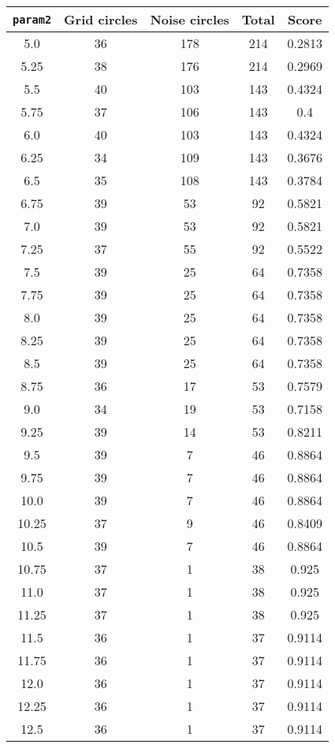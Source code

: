 \documentclass[letterpaper, 12pt]{article}
\begin{document}
\begin{longtable}{|c|c|c|c|c|}
\hline
\textbf{\texttt{param2}} & \textbf{Grid circles} & \textbf{Noise circles} & \textbf{Total} & \textbf{Score} \\
\hline
5.0 & 36 & 178 & 214 & 0.2813 \\
\hline
5.25 & 38 & 176 & 214 & 0.2969 \\
\hline
5.5 & 40 & 103 & 143 & 0.4324 \\
\hline
5.75 & 37 & 106 & 143 & 0.4 \\
\hline
6.0 & 40 & 103 & 143 & 0.4324 \\
\hline
6.25 & 34 & 109 & 143 & 0.3676 \\
\hline
6.5 & 35 & 108 & 143 & 0.3784 \\
\hline
6.75 & 39 & 53 & 92 & 0.5821 \\
\hline
7.0 & 39 & 53 & 92 & 0.5821 \\
\hline
7.25 & 37 & 55 & 92 & 0.5522 \\
\hline
7.5 & 39 & 25 & 64 & 0.7358 \\
\hline
7.75 & 39 & 25 & 64 & 0.7358 \\
\hline
8.0 & 39 & 25 & 64 & 0.7358 \\
\hline
8.25 & 39 & 25 & 64 & 0.7358 \\
\hline
8.5 & 39 & 25 & 64 & 0.7358 \\
\hline
8.75 & 36 & 17 & 53 & 0.7579 \\
\hline
9.0 & 34 & 19 & 53 & 0.7158 \\
\hline
9.25 & 39 & 14 & 53 & 0.8211 \\
\hline
9.5 & 39 & 7 & 46 & 0.8864 \\
\hline
9.75 & 39 & 7 & 46 & 0.8864 \\
\hline
10.0 & 39 & 7 & 46 & 0.8864 \\
\hline
10.25 & 37 & 9 & 46 & 0.8409 \\
\hline
10.5 & 39 & 7 & 46 & 0.8864 \\
\hline
10.75 & 37 & 1 & 38 & 0.925 \\
\hline
11.0 & 37 & 1 & 38 & 0.925 \\
\hline
11.25 & 37 & 1 & 38 & 0.925 \\
\hline
11.5 & 36 & 1 & 37 & 0.9114 \\
\hline
11.75 & 36 & 1 & 37 & 0.9114 \\
\hline
12.0 & 36 & 1 & 37 & 0.9114 \\
\hline
12.25 & 36 & 1 & 37 & 0.9114 \\
\hline
12.5 & 36 & 1 & 37 & 0.9114 \\

\end{longtable}
\end{document}
